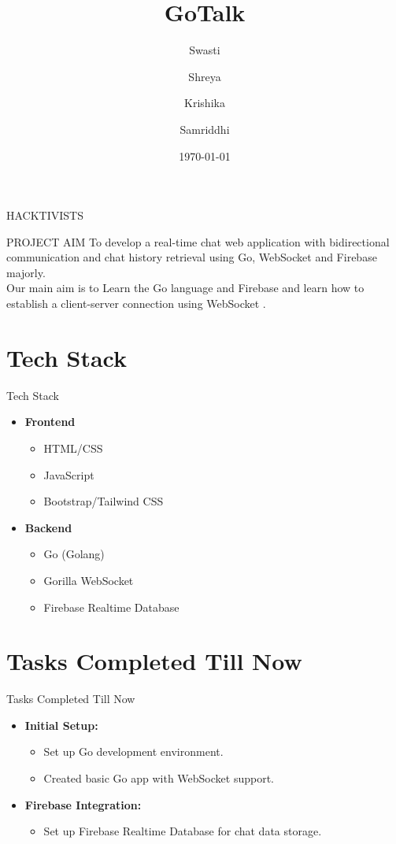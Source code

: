 \documentclass{beamer}
\title{GoTalk}
\author{Swasti \and Shreya \and Krishika \and Samriddhi}
\date{\today}
\begin{document}
\begin{frame}
    \titlepage
    \centering HACKTIVISTS
\end{frame}

\begin{frame}{PROJECT AIM}
    To develop a real-time chat web application with bidirectional communication and chat history retrieval using Go, WebSocket and Firebase majorly.   
    \\
    Our main aim is to Learn the Go language and Firebase and learn how to establish a client-server connection using WebSocket .
\end{frame}

\section{Tech Stack}
\begin{frame}{Tech Stack}
    \begin{itemize}
        \item \textbf{Frontend}
        \begin{itemize}
            \item HTML/CSS
            \item JavaScript
            \item Bootstrap/Tailwind CSS
        \end{itemize}
        \item \textbf{Backend}
        \begin{itemize}
            \item Go (Golang)
            \item Gorilla WebSocket
            \item Firebase Realtime Database
        \end{itemize}
    \end{itemize}
\end{frame}

\section{Tasks Completed Till Now}

\begin{frame}{Tasks Completed Till Now}
    \begin{itemize}
        \item \textbf{Initial Setup:}
        \begin{itemize}
            \item Set up Go development environment.
            \item Created basic Go app with WebSocket support.
        \end{itemize}
        \item \textbf{Firebase Integration:}
        \begin{itemize}
            \item Set up Firebase Realtime Database for chat data storage.
        \end{itemize}
    \end{itemize}
\end{frame}
\end{document}
